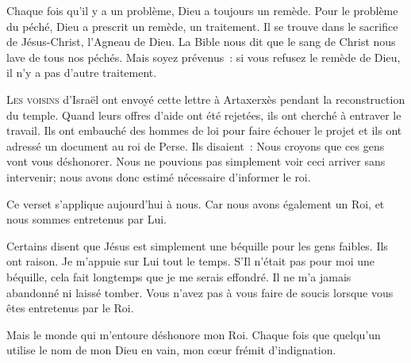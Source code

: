 Chaque fois qu'il y a un problème, Dieu a toujours un remède.
 Pour le problème du péché, Dieu a prescrit un remède, un traitement.
 Il se trouve dans le sacrifice de Jésus-Christ, l'Agneau de Dieu.
 La Bible nous dit que le sang de Christ nous lave de tous nos péchés.
 Mais soyez prévenus~: si vous refusez le remède de Dieu,
 il n'y a pas d'autre traitement. 

\dvrule








\lettrine{L}{es voisins} d'Israël ont envoyé cette lettre à Artaxerxès
 pendant la reconstruction du temple.
 Quand leurs offres d'aide ont été rejetées,
 ils ont cherché à entraver le travail.
 Ils ont embauché des hommes de loi pour faire échouer le projet
 et ils ont adressé un document au roi de Perse.
 Ils disaient~: \Og Nous croyons que ces gens vont vous déshonorer.
 Nous ne pouvions pas simplement voir ceci arriver sans intervenir;
 nous avons donc estimé nécessaire d'informer le roi. \Fg{}

Ce verset s'applique aujourd'hui à nous. Car nous avons également un Roi,
 et nous sommes entretenus par Lui.

Certains disent que Jésus est simplement une béquille pour les gens faibles.
 Ils ont raison. Je m'appuie sur Lui tout le temps.
 S'Il n'était pas pour moi une béquille,
 cela fait longtemps que je me serais effondré.
 Il ne m'a jamais abandonné ni laissé tomber.
 Vous n'avez pas à vous faire de soucis lorsque vous êtes entretenus par le Roi.

Mais le monde qui m'entoure déshonore mon Roi.
 Chaque fois que quelqu'un utilise le nom de mon Dieu en vain,
 mon c\oe{}ur frémit d'indignation. 


